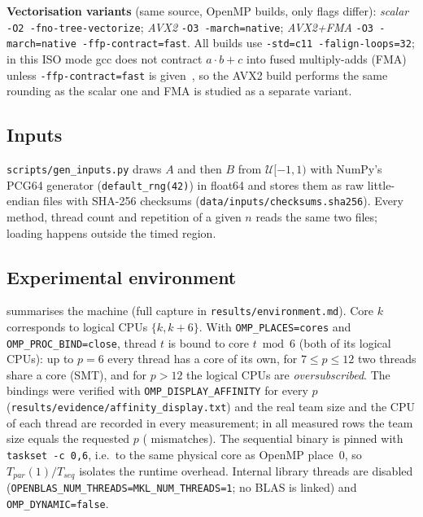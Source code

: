 \documentclass[conference,a4paper]{IEEEtran}
\begin{document}
\textbf{Vectorisation variants} (same source, OpenMP builds, only flags differ): \emph{scalar}
\texttt{-O2 -fno-tree-vectorize}; \emph{AVX2} \texttt{-O3 -march=native}; \emph{AVX2+FMA}
\texttt{-O3 -march=native -ffp-contract=fast}. All builds use \texttt{-std=c11 -falign-loops=32}; in
this ISO mode gcc
does not contract $a\cdot b+c$ into fused multiply-adds (FMA) unless \texttt{-ffp-contract=fast} is
given~\cite{gccopt13}, so the AVX2 build performs the same rounding as the scalar one and FMA is
studied as a separate variant.

\subsection{Inputs}
\texttt{scripts/gen\_inputs.py} draws $A$ and then $B$ from $\mathcal{U}[-1,1)$ with NumPy's PCG64
generator (\texttt{default\_rng(42)}) in float64 and stores them as raw little-endian files with
SHA-256 checksums (\texttt{data/inputs/checksums.sha256}). Every method, thread count and repetition
of a given $n$ reads the same two files; loading happens outside the timed region.

\subsection{Experimental environment}
 summarises the machine (full capture in \texttt{results/environment.md}). Core $k$
corresponds to logical CPUs $\{k,k+6\}$. With \texttt{OMP\_PLACES=cores} and
\texttt{OMP\_PROC\_BIND=close}, thread $t$ is bound to core $t\bmod 6$ (both of its logical CPUs):
up to $p=6$ every thread has a core of its own, for $7\le p\le12$ two threads share a core (SMT), and
for $p>12$ the logical CPUs are \emph{oversubscribed}. The bindings were verified with
\texttt{OMP\_DISPLAY\_AFFINITY} for every $p$ (\texttt{results/evidence/affinity\_display.txt}) and the
real team size and the CPU of each thread are recorded in every measurement; in all
\NumRowsMeasured{} measured rows the team size equals the requested $p$ (\NumThreadMismatch{}
mismatches). The sequential binary is pinned with \texttt{taskset -c 0,6}, i.e.\ to the same physical
core as OpenMP place~0, so $T_{par}(1)/T_{seq}$ isolates the runtime overhead. Internal library
threads are disabled (\texttt{OPENBLAS\_NUM\_THREADS=MKL\_NUM\_THREADS=1}; no BLAS is linked) and
\texttt{OMP\_DYNAMIC=false}.
\end{document}
